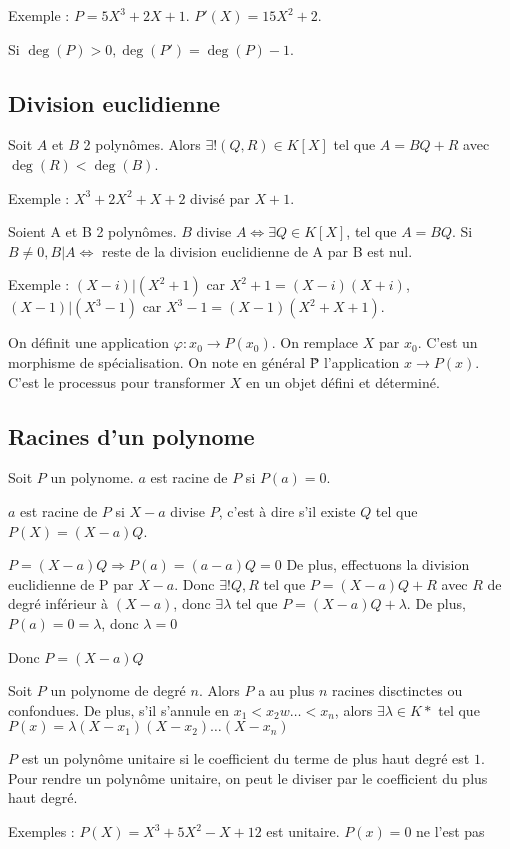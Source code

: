 \documentclass[french]{yLectureNote}
\begin{document}
Exemple : $P = 5X^3+2X+1$. $P'(X) = 15X^2+2$.

Si $\deg(P)>0, \deg(P') = \deg(P)-1$.
\subsection{Division euclidienne}
\begin{theorem}
Soit $A$ et $B$ 2 polyn\^omes. Alors $\exists!(Q,R)\in K[X]$ tel que $A=BQ+R$ avec $\deg(R)<\deg(B)$.
\end{theorem}
Exemple : $X^3+2X^2+X+2$ divisé par $X+1$.

\begin{definition}[]
Soient A et B 2 polyn\^omes. $B$ divise $A \iff \exists Q\in K[X]$, tel que $A=BQ$. Si $B\neq 0, B|A\iff$ reste de la division euclidienne de A par B est nul.
\end{definition}
Exemple : $(X-i)|(X^2+1)$ car $X^2+1=(X-i)(X+i)$, $(X-1)|(X^3-1)$ car $X^3-1=(X-1)(X^2+X+1)$.
\begin{definition}
On définit une application $\varphi : x_0\to P(x_0)$. On remplace $X$ par $x_0$. C'est un morphisme de spécialisation. On note en général \~{P} l'application $x\to P(x)$. C'est le processus pour transformer $X$ en un objet défini et déterminé.
\end{definition}
\subsection{Racines d'un polynome}
\begin{definition}[Racine]
Soit $P$ un polynome. $a$ est racine de $P$ si $P(a) = 0$.
\end{definition}
\begin{theorem}[]
$a$ est racine de $P$ si $X-a$ divise $P$, c'est à dire s'il existe $Q$ tel que $P(X) = (X-a)Q$.
\end{theorem}
\begin{myproof}
$P=(X-a)Q \Rightarrow P(a) = (a-a)Q = 0$ De plus, effectuons la division euclidienne de P par $X-a$. Donc $\exists! Q,R$ tel que $P=(X-a)Q + R$ avec $R$ de degré inférieur à $(X-a)$, donc $\exists \lambda$ tel que $P=(X-a)Q+\lambda$. De plus, $P(a) = 0 = \lambda$, donc $\lambda  = 0$

Donc $P=(X-a)Q$
\end{myproof}
\begin{theorem}[Corrolaire]
Soit $P$ un polynome de degré $n$. Alors $P$ a au plus $n$ racines disctinctes ou confondues. De plus, s'il s'annule en $x_1<x_2w\dots<x_n$, alors $\exists \lambda \in K*$ tel que $P(x) = \lambda(X-x_1)(X-x_2)\dots(X-x_n)$
\end{theorem}
\begin{definition}
$P$ est un polyn\^ome unitaire si le coefficient du terme de plus haut degré est $1$. Pour rendre un polyn\^ome unitaire, on peut le diviser par le coefficient du plus haut degré.
\end{definition}
Exemples : $P(X)  =X^3+5X^2-X+12$ est unitaire. $P(x) = 0$ ne l'est pas
\end{document}
